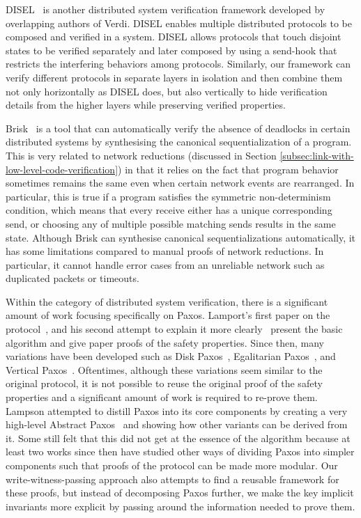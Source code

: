 DISEL~\cite{disel} is another distributed system verification framework developed 
by overlapping authors of Verdi. DISEL enables multiple distributed protocols 
to be composed and verified in a system. 
DISEL allows protocols that touch disjoint states to be verified
separately and later composed by using a send-hook
that restricts the interfering behaviors among protocols. 
Similarly, our framework can verify different protocols in separate layers in isolation and then combine them not only horizontally as DISEL does,
but also vertically to hide verification details from the higher layers while preserving verified properties.

Brisk~\cite{canonical} is a tool that can automatically verify the absence of deadlocks in certain distributed systems
by synthesising the canonical sequentialization of a program.
This is very related to network reductions (discussed in Section \ref{subsec:link-with-low-level-code-verification})
in that it relies on the fact that program behavior sometimes remains the same even when certain network events are rearranged.
In particular, this is true if a program satisfies the symmetric non-determinism condition, which means
that every receive either has a unique corresponding send, or choosing any of multiple possible matching sends results in the same state.
Although Brisk can synthesise canonical sequentializations automatically, it has some limitations compared to manual proofs
of network reductions.
In particular, it cannot handle error cases from an unreliable network such as duplicated packets or timeouts.

Within the category of distributed system verification, there is a significant amount of work focusing specifically on Paxos.
Lamport's first paper on the protocol~\cite{paxos}, and his second attempt to explain it more clearly~\cite{paxosmadesimple}
present the basic algorithm and give paper proofs of the safety properties.
Since then, many variations have been developed such as Disk Paxos~\cite{diskpaxos}, Egalitarian Paxos~\cite{epaxos},
and Vertical Paxos~\cite{vertpaxos}.
Oftentimes, although these variations seem similar to the original protocol, it is not possible to reuse the original
proof of the safety properties and a significant amount of work is required to re-prove them.
Lampson attempted to distill Paxos into its core components by creating a very high-level Abstract Paxos~\cite{Lampson2001}
and showing how other variants can be derived from it.
Some still felt that this did not get at the essence of the algorithm because at least two works since then \cite{dpaxos, sdpaxos}
have studied other ways of dividing Paxos into simpler components such that proofs of the protocol can be made more modular.
Our write-witness-passing approach also attempts to find a reusable framework for these proofs,
but instead of decomposing Paxos further, we make the key implicit invariants more explicit by passing around
the information needed to prove them.

